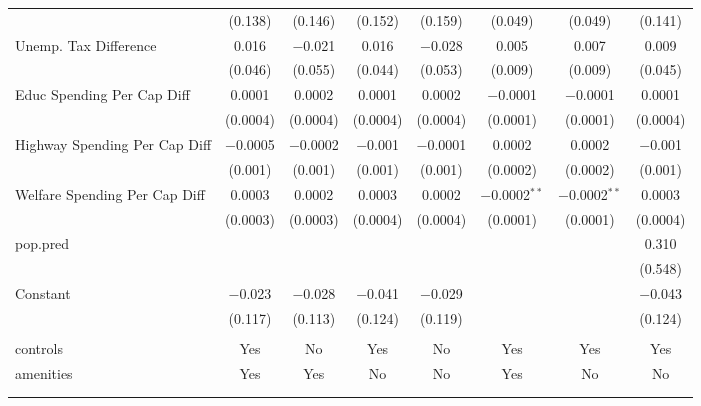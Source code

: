\begin{table}[!htbp]
\begin{tabular}{@{\extracolsep{5pt}}lccccccc}
  & (0.138) & (0.146) & (0.152) & (0.159) & (0.049) & (0.049) & (0.141) \\ 
  Unemp. Tax Difference & 0.016 & $-$0.021 & 0.016 & $-$0.028 & 0.005 & 0.007 & 0.009 \\ 
  & (0.046) & (0.055) & (0.044) & (0.053) & (0.009) & (0.009) & (0.045) \\ 
  Educ Spending Per Cap Diff & 0.0001 & 0.0002 & 0.0001 & 0.0002 & $-$0.0001 & $-$0.0001 & 0.0001 \\ 
  & (0.0004) & (0.0004) & (0.0004) & (0.0004) & (0.0001) & (0.0001) & (0.0004) \\ 
  Highway Spending Per Cap Diff & $-$0.0005 & $-$0.0002 & $-$0.001 & $-$0.0001 & 0.0002 & 0.0002 & $-$0.001 \\ 
  & (0.001) & (0.001) & (0.001) & (0.001) & (0.0002) & (0.0002) & (0.001) \\ 
  Welfare Spending Per Cap Diff & 0.0003 & 0.0002 & 0.0003 & 0.0002 & $-$0.0002$^{**}$ & $-$0.0002$^{**}$ & 0.0003 \\ 
  & (0.0003) & (0.0003) & (0.0004) & (0.0004) & (0.0001) & (0.0001) & (0.0004) \\ 
  pop.pred &  &  &  &  &  &  & 0.310 \\ 
  &  &  &  &  &  &  & (0.548) \\ 
  Constant & $-$0.023 & $-$0.028 & $-$0.041 & $-$0.029 &  &  & $-$0.043 \\ 
  & (0.117) & (0.113) & (0.124) & (0.119) &  &  & (0.124) \\ 
 \hline \\[-1.8ex] 
controls & Yes & No & Yes & No & Yes & Yes & Yes \\ 
amenities & Yes & Yes & No & No & Yes & No & No \\ 
\hline \\[-1.8ex] 
\hline 
\hline \\[-1.8ex] 
\end{tabular} 
\end{table} 
